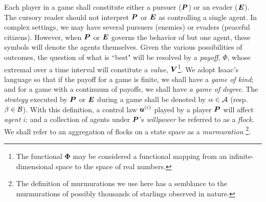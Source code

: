 Each player in a game shall constitute either a pursuer ($\bm{P}$) or an evader ($\bm{E}$). The cursory reader should not interpret $\bm{P}$ or $\bm{E}$ as controlling a single agent. In complex settings, we may have several pursuers (enemies) or evaders (peaceful citizens). However, when $\bm{P}$ or $\bm{E}$ governs the behavior of but one agent, these symbols will denote the agents themselves. %
Given the various possibilities of outcomes, the question of what is ``best" will be resolved by a \textit{payoff}, $\Phi$, whose extremal over a time interval will constitute a \textit{value}, $\bm{V}$\footnote{The functional $\bm{\Phi}$ may be considered a functional mapping from an infinite-dimensional space to the space of real numbers.}. We adopt Isaac's~\cite{Isaacs1965} language so that if the payoff for a game is finite, we shall have a \textit{game of kind}; and for a game with a continuum of payoffs, we shall have \textit{a game of degree}. The \textit{strategy} executed by $\bm{P}$ or $\bm{E}$ during a game shall be denoted by $\alpha \in \mathcal{A}$ (resp. $\beta \in \mathcal{B}$). With this definition, a control law \eg $\bm{u}^{(i)}$ played by a player \eg $\bm{P}$ will affect \textit{agent} $i$; and a collection of agents under $\bm{P}$'s \textit{willpower} be referred to as a \textit{flock}. We shall refer to an aggregation of flocks on a state space as a \textit{murmuration} \footnote{The definition of murmurations we use here has a semblance to the murmurations of possibly thousands of starlings observed in nature.}.
%